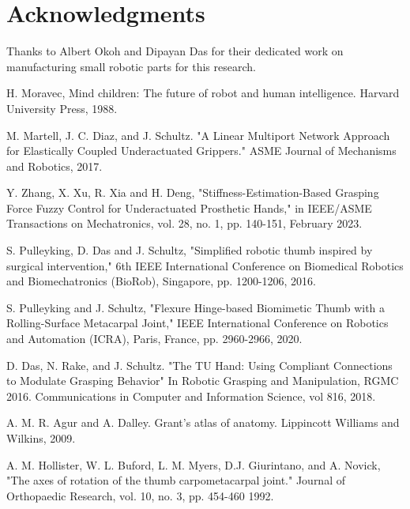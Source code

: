 \documentclass[journal]{IEEEtran}
\begin{document}
\section*{Acknowledgments}
Thanks to Albert Okoh and Dipayan Das for their dedicated work on manufacturing small robotic parts for this research.

\begin{thebibliography}{1}
 



 H. Moravec, Mind children: The future of robot and human intelligence. Harvard University Press, 1988.

 M. Martell, J. C. Diaz, and J. Schultz. "A Linear Multiport Network Approach for Elastically Coupled Underactuated Grippers." ASME Journal of Mechanisms and Robotics, 2017.

Y. Zhang, X. Xu, R. Xia and H. Deng, "Stiffness-Estimation-Based Grasping Force Fuzzy Control for Underactuated Prosthetic Hands," in IEEE/ASME Transactions on Mechatronics, vol. 28, no. 1, pp. 140-151, February 2023.

 S. Pulleyking, D. Das and J. Schultz, "Simplified robotic thumb inspired by surgical intervention," 6th IEEE International Conference on Biomedical Robotics and Biomechatronics (BioRob), Singapore, pp. 1200-1206, 2016.

 S. Pulleyking and J. Schultz, "Flexure Hinge-based Biomimetic Thumb with a Rolling-Surface Metacarpal Joint," IEEE International Conference on Robotics and Automation (ICRA), Paris, France, pp. 2960-2966, 2020.

 D. Das, N. Rake, and J. Schultz. "The TU Hand: Using Compliant Connections to Modulate Grasping Behavior" In Robotic Grasping and Manipulation, RGMC 2016. Communications in Computer and Information Science, vol 816, 2018.

 A. M. R. Agur and A. Dalley. Grant's atlas of anatomy. Lippincott Williams and Wilkins, 2009.

 A. M. Hollister, W. L. Buford, L. M. Myers, D.J. Giurintano, and A. Novick, "The axes of rotation of the thumb carpometacarpal joint." Journal of Orthopaedic Research, vol. 10, no. 3, pp. 454-460 1992.


\end{thebibliography}
\end{document}
